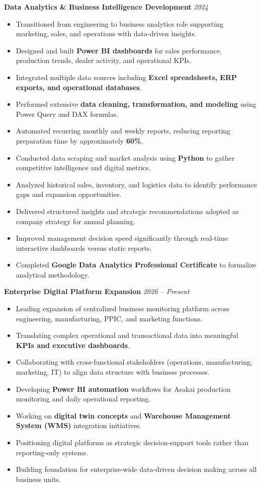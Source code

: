 \documentclass[a4paper,10pt]{article}
\begin{document}
\textbf{Data Analytics \& Business Intelligence Development} \hfill \textit{2024}
\begin{itemize}
    \item Transitioned from engineering to business analytics role supporting marketing, sales, and operations with data-driven insights.
    \item Designed and built \textbf{Power BI dashboards} for sales performance, production trends, dealer activity, and operational KPIs.
    \item Integrated multiple data sources including \textbf{Excel spreadsheets, ERP exports, and operational databases}.
    \item Performed extensive \textbf{data cleaning, transformation, and modeling} using Power Query and DAX formulas.
    \item Automated recurring monthly and weekly reports, reducing reporting preparation time by approximately \textbf{60\%}.
    \item Conducted data scraping and market analysis using \textbf{Python} to gather competitive intelligence and digital metrics.
    \item Analyzed historical sales, inventory, and logistics data to identify performance gaps and expansion opportunities.
    \item Delivered structured insights and strategic recommendations adopted as company strategy for annual planning.
    \item Improved management decision speed significantly through real-time interactive dashboards versus static reports.
    \item Completed \textbf{Google Data Analytics Professional Certificate} to formalize analytical methodology.
\end{itemize}

\vspace{6pt}

\textbf{Enterprise Digital Platform Expansion} \hfill \textit{2026 – Present}
\begin{itemize}
    \item Leading expansion of centralized business monitoring platform across engineering, manufacturing, PPIC, and marketing functions.
    \item Translating complex operational and transactional data into meaningful \textbf{KPIs and executive dashboards}.
    \item Collaborating with cross-functional stakeholders (operations, manufacturing, marketing, IT) to align data structure with business processes.
    \item Developing \textbf{Power BI automation} workflows for Asakai production monitoring and daily operational reporting.
    \item Working on \textbf{digital twin concepts} and \textbf{Warehouse Management System (WMS)} integration initiatives.
    \item Positioning digital platforms as strategic decision-support tools rather than reporting-only systems.
    \item Building foundation for enterprise-wide data-driven decision making across all business units.
\end{itemize}
\end{document}
